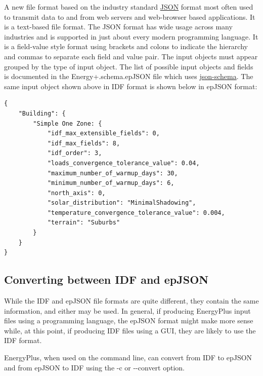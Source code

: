 A new file format based on the industry standard \href{https://www.json.org/}{JSON}
format most often used to transmit data to and from web servers and
web-browser based applications. It is a text-based file format. The
JSON format has wide usage across many industries and is supported
in just about every modern programming language. It is a field-value
style format using brackets and colons to indicate the hierarchy and
commas to separate each field and value pair. The input objects must
appear grouped by the type of input object. The list of possible input
objects and fields is documented in the Energy+.schema.epJSON file
which uses \href{http://json-schema.org/}{json-schema}. The same
input object shown above in IDF format is shown below in epJSON format:
\begin{verbatim}
{
    "Building": {
        "Simple One Zone: {
            "idf_max_extensible_fields": 0,
            "idf_max_fields": 8,
            "idf_order": 3,
            "loads_convergence_tolerance_value": 0.04,
            "maximum_number_of_warmup_days": 30,
            "minimum_number_of_warmup_days": 6,
            "north_axis": 0,
            "solar_distribution": "MinimalShadowing",
            "temperature_convergence_tolerance_value": 0.004,
            "terrain": "Suburbs"
        }
    }
}
\end{verbatim}


\subsection*{Converting between IDF and epJSON}

While the IDF and epJSON file formats are quite different, they contain
the same information, and either may be used. In general, if producing
EnergyPlus input files using a programming language, the epJSON format
might make more sense while, at this point, if producing IDF files
using a GUI, they are likely to use the IDF format. 

EnergyPlus, when
used on the command line, can convert from IDF to epJSON and from
epJSON to IDF using the -c or -{}-convert option.

